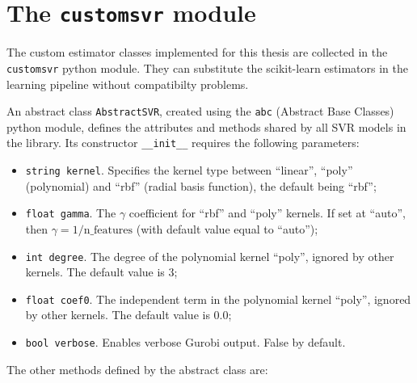 \documentclass[12pt]{report}
\begin{document}
\section{The \texttt{customsvr} module}
The custom estimator classes implemented for this thesis are collected in the \texttt{customsvr} python module. They can substitute the scikit-learn estimators in the learning pipeline without compatibilty problems.

An abstract class \texttt{AbstractSVR}, created using the \texttt{abc} (Abstract Base Classes) python module, defines the attributes and methods shared by all SVR models in the library. Its constructor \texttt{\_\_init\_\_} requires the following parameters:
\begin{itemize}
\item \texttt{string kernel}. Specifies the kernel type between ``linear'', ``poly'' (polynomial) and ``rbf'' (radial basis function), the default being ``rbf'';
\item \texttt{float gamma}. The $\gamma$ coefficient for ``rbf'' and ``poly'' kernels. If set at ``auto'', then $\gamma=1/\text{n\_features}$ (with default value equal to ``auto'');
\item \texttt{int degree}. The degree of the polynomial kernel ``poly'', ignored by other kernels. The default value is 3;
\item \texttt{float coef0}. The independent term in the polynomial kernel ``poly'', ignored by other kernels. The default value is 0.0;
\item \texttt{bool verbose}. Enables verbose Gurobi output. False by default.
\end{itemize}
The other methods defined by the abstract class are:
\end{document}
